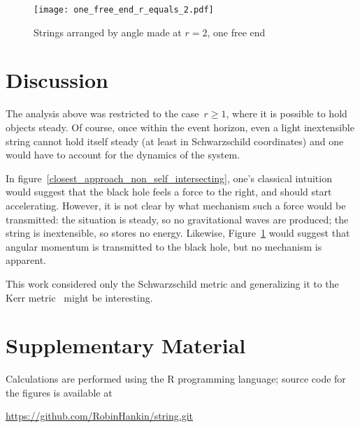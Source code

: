 \documentclass[times,twocolumn,final]{elsarticle}
\begin{document}
\begin{figure}[h!]
\centering
\texttt{[image: one\_free\_end\_r\_equals\_2.pdf]}
\caption{Strings arranged by angle made at $r=2$, one free end}
\label{one_free_end}
\end{figure}


\section{Discussion}

The analysis above was restricted to the case~$r\geq 1$, where it is
possible to hold objects steady.  Of course, once within the event
horizon, even a light inextensible string cannot hold itself steady
(at least in Schwarzschild coordinates) and one would have to account
for the dynamics of the system.

In figure~\ref{closest_approach_non_self_intersecting}, one's
classical intuition would suggest that the black hole feels a force to
the right, and should start accelerating.  However, it is not clear by
what mechanism such a force would be transmitted: the situation is
steady, so no gravitational waves are produced; the string is
inextensible, so stores no energy.  Likewise,
Figure~\ref{one_free_end} would suggest that angular momentum is
transmitted to the black hole, but no mechanism is apparent.

This work considered only the Schwarzschild metric and generalizing it
to the Kerr metric~\cite{kerr1963} might be interesting.  





\section*{Supplementary Material}

Calculations are performed using the R programming language; source
code for the figures is available at

\url{https://github.com/RobinHankin/string.git}
\end{document}
